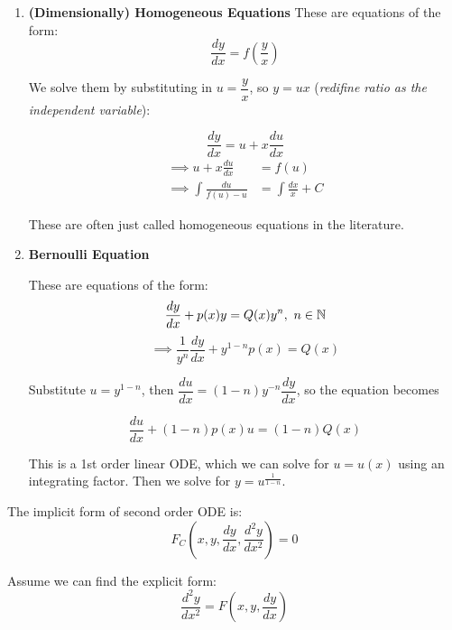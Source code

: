 \documentclass[10pt]{scrartcl}
\begin{document}
\begin{enumerate}[(1)]
\item \textbf{(Dimensionally) Homogeneous Equations}
These are equations of the form:
\[\frac{dy}{dx} = f\left(\frac{y}{x}\right)\]

We solve them by substituting in $u = \dfrac{y}{x}$, so $y = ux$ (\textit{redifine ratio as the independent variable}):

\[
    \frac{dy}{dx} = u + x \frac{du}{dx}
\]
\[
\begin{aligned}
  \implies u + x\frac{du}{dx} &= f(u)\\
  \implies \int \frac{du}{f(u) -u} &= \int \frac{dx}{x} + C
\end{aligned}
\]
\begin{note}These are often just called homogeneous equations in the literature.\end{note}


\item \textbf{Bernoulli Equation}

These are equations of the form: \[\dfrac{dy}{dx} + p(x)y = Q(x)y^n,\ n \in \mathbb{N}\]
\[\implies \frac{1}{y^n}\frac{dy}{dx} + y^{1-n}p(x) = Q(x)\]

Substitute $u = y^{1-n}$, then $\dfrac{du}{dx} = (1-n)y^{-n}\dfrac{dy}{dx}$, so the equation becomes

\[  \frac{du}{dx} + (1-n)p(x)u = (1-n)Q(x)\]

This is a 1st order linear ODE, which we can solve for $u = u(x)$ using an integrating factor. Then we solve for $y = u^{\frac{1}{1-n}}$. 
\end{enumerate}

The implicit form of second order ODE is:
\[F_C\left(x,y,\frac{dy}{dx}, \frac{d^2y}{dx^2}\right) = 0\]

Assume we can find the explicit form: 
\[\frac{d^2y}{dx^2} = F\left(x,y,\frac{dy}{dx}\right)\]
\end{document}
